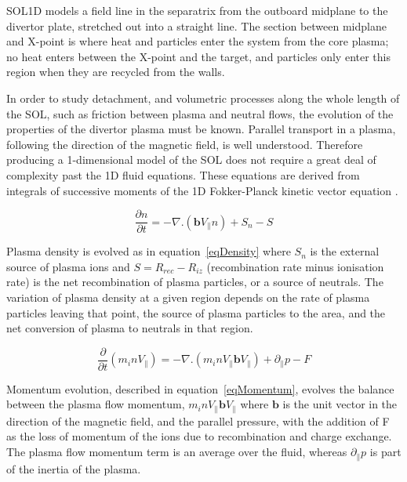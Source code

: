\documentclass[12pt]{article}  %
\begin{document}
SOL1D models a field line in the separatrix from the outboard midplane to the divertor plate, stretched out into a straight line. The section between midplane and X-point is where heat and particles enter the system from the core plasma; no heat enters between the X-point and the target, and particles only enter this region when they are recycled from the walls.

In order to study detachment, and volumetric processes along the whole length of the SOL, such as friction between plasma and neutral flows, the evolution of the properties of the divertor plasma must be known. Parallel transport in a plasma, following the direction of the magnetic field, is well understood. Therefore producing a 1-dimensional model of the SOL does not require a great deal of complexity past the 1D fluid equations. These equations are derived from integrals of successive moments of the 1D Fokker-Planck kinetic vector equation \cite{Stangeby}.

\begin{equation}\label{eqDensity}
\frac{\partial n}{\partial t} = -\nabla . (\textbf{b}V_{\parallel}n) + S_n - S
\end{equation}

Plasma density is evolved as in equation~\ref{eqDensity} where $S_n$ is the external source of plasma ions and $S=R_{rec} - R_{iz}$ (recombination rate minus ionisation rate) is the net recombination of plasma particles, or a source of neutrals. The variation of plasma density at a given region depends on the rate of plasma particles leaving that point, the source of plasma particles to the area, and the net conversion of plasma to neutrals in that region.

\begin{equation}\label{eqMomentum}
\frac{\partial}{\partial t}(m_i n V_{\parallel}) = -\nabla . (m_i n V_{\parallel} \textbf{b} V_{\parallel}) + \partial_{\parallel}p - F
\end{equation}

Momentum evolution, described in equation~\ref{eqMomentum}, evolves the balance between the plasma flow momentum, $m_inV_{\parallel}\textbf{b}V_{\parallel}$ where $\textbf{b}$ is the unit vector in the direction of the magnetic field, and the parallel pressure, with the addition of F as the loss of momentum of the ions due to recombination and charge exchange. The plasma flow momentum term is an average over the fluid, whereas $\partial_{\parallel}p$ is part of the inertia of the plasma.
\end{document}
